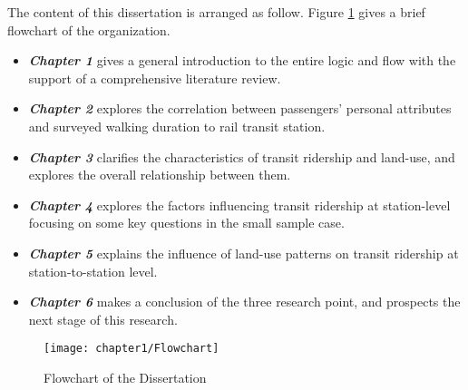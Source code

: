The content of this dissertation is arranged as follow. Figure \ref{fig:chp1:Flowchart} gives a brief flowchart of the organization.

\begin{itemize}
	\item \emph{\textbf{Chapter 1}} gives a general introduction to the entire logic and flow with the support of a comprehensive literature review.
	\item \emph{\textbf{Chapter 2}} explores the correlation between passengers' personal attributes and surveyed walking duration to rail transit station.
	\item \emph{\textbf{Chapter 3}} clarifies the characteristics of transit ridership and land-use, and explores the overall relationship between them.
	\item \emph{\textbf{Chapter 4}} explores the factors influencing transit ridership at station-level focusing on some key questions in the small sample case.
	\item \emph{\textbf{Chapter 5}} explains the influence of land-use patterns on transit ridership at station-to-station level.
	\item \emph{\textbf{Chapter 6}} makes a conclusion of the three research point, and prospects the next stage of this research.
\end{itemize}

\begin{figure}[htbp]
	\centering
	\texttt{[image: chapter1/Flowchart]}
	\caption{Flowchart of the Dissertation}
	\label{fig:chp1:Flowchart}
\end{figure}

\clearpage %

% 
